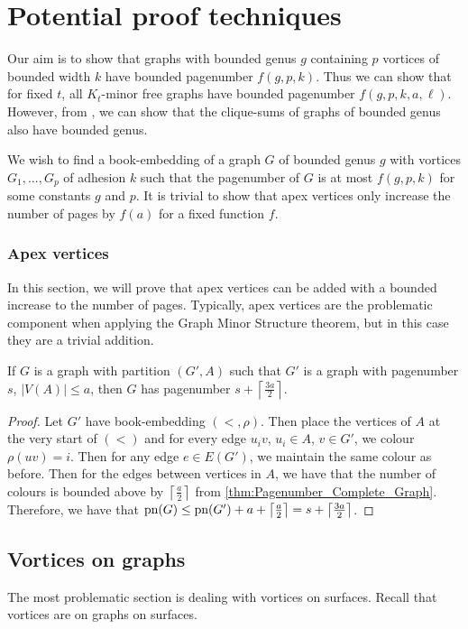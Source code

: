 
\chapter{Potential proof techniques}\label{chap:Proving_The_Theorem}
Our aim is to show that graphs with bounded genus $g$ containing $p$ vortices of bounded width $k$ have bounded pagenumber $f(g, p, k)$. Thus we can show that for fixed $t$, all $K_t$-minor free graphs have bounded pagenumber $f(g, p, k, a, \ell)$. However, from \cite{hickingbothamStackNumberCliqueSum2023}, we can show that the clique-sums of graphs of bounded genus also have bounded genus.

We wish to find a book-embedding of a graph $G$ of bounded genus $g$ with vortices $G_1, ..., G_p$ of adhesion $k$ such that the pagenumber of $G$ is at most $f(g, p, k)$ for some constants $g$ and $p$. It is trivial to show that apex vertices only increase the number of pages by $f(a)$ for a fixed function $f$. 
\subsection{Apex vertices}
In this section, we will prove that apex vertices can be added with a bounded increase to the number of pages. Typically, apex vertices are the problematic component when applying the Graph Minor Structure theorem, but in this case they are a trivial addition.
\begin{theorem}
	If $G$ is a graph with partition $(G', A)$ such that $G'$ is a graph with pagenumber $s$, $|V(A)| \leq a$, then $G$ has pagenumber $s + \left\lceil \frac{3a}{2}\right\rceil$. 
\end{theorem}
\begin{proof}
	Let $G'$ have book-embedding $(<, \rho)$. Then place the vertices of $A$ at the very start of $(<)$ and for every edge $u_iv$, $u_i \in A$, $v \in G'$, we colour $\rho(uv) = i$. Then for any edge $e \in E(G')$, we maintain the same colour as before. Then for the edges between vertices in $A$, we have that the number of colours is bounded above by $\left\lceil \frac{a}{2} \right\rceil$ from \cref{thm:Pagenumber_Complete_Graph}. Therefore, we have that $\text{pn}(G) \leq \text{pn}(G') + a + \left\lceil \frac{a}{2} \right\rceil =s + \left\lceil \frac{3a}{2}\right\rceil$. 
\end{proof}

\section{Vortices on graphs}
The most problematic section is dealing with vortices on surfaces. Recall that vortices are on graphs on surfaces. 

